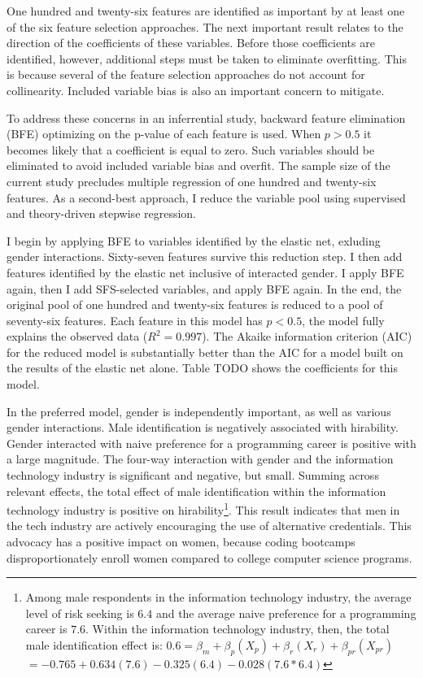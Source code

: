 \documentclass[review]{elsarticle}
\begin{document}
One hundred and twenty-six features are identified as important by at least one of the six feature selection approaches.
The next important result relates to the direction of the coefficients of these variables.
Before those coefficients are identified, however, additional steps must be taken to eliminate overfitting.
This is because several of the feature selection approaches do not account for collinearity.
Included variable bias is also an important concern to mitigate.

To address these concerns in an inferrential study, backward feature elimination (BFE) optimizing on the p-value of each feature is used.
When $p > 0.5$ it becomes likely that a coefficient is equal to zero.
Such variables should be eliminated to avoid included variable bias and overfit.
The sample size of the current study precludes multiple regression of one hundred and twenty-six features.
As a second-best approach, I reduce the variable pool using supervised and theory-driven stepwise regression.

I begin by applying BFE to variables identified by the elastic net, exluding gender interactions.
Sixty-seven features survive this reduction step.
I then add features identified by the elastic net inclusive of interacted gender.
I apply BFE again, then I add SFS-selected variables, and apply BFE again.
In the end, the original pool of one hundred and twenty-six features is reduced to a pool of seventy-six features.
Each feature in this model has $p < 0.5$,
the model fully explains the observed data ($R^2 = 0.997$).
The Akaike information criterion (AIC) for the reduced model is substantially better than the AIC for a model built on the results of the elastic net alone.
Table TODO shows the coefficients for this model.

In the preferred model, gender is independently important, as well as various gender interactions.
Male identification is negatively associated with hirability.
Gender interacted with naive preference for a programming career is positive with a large magnitude.
The four-way interaction with gender and the information technology industry is significant and negative, but small.
Summing across relevant effects,
the total effect of male identification within the information technology industry
is positive on hirability\footnote{
    Among male respondents in the information technology industry, the average level of risk seeking is $6.4$
    and the average naive preference for a programming career is $7.6$.
    Within the information technology industry, then, the total male identification effect is:
    $ 0.6 = \beta_{m} + \beta_{p}(X_{p}) + \beta_{r}(X_{r}) + \beta_{pr}(X_{pr})$
    $ = -0.765 + 0.634(7.6) - 0.325(6.4) - 0.028(7.6*6.4)$
}.
This result indicates that men in the tech industry are actively encouraging the use of alternative credentials.
This advocacy has a positive impact on women, because coding bootcamps disproportionately enroll women compared to college computer science programs.
\end{document}
